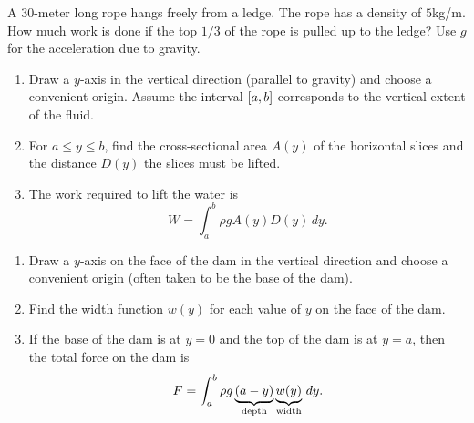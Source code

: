 \documentclass[../mathNotesPreamble]{subfiles}
\begin{document}
  \begin{ex*}
    A $30$-meter long rope hangs freely from a ledge. The rope has a density of $5$\nobreakspace kg/m.  How much work is done if the top $1/3$ of the rope is pulled up to the ledge? Use $g$ for the acceleration due to gravity.
  \end{ex*}
  \pagebreak

  \begin{thmBox*}
    \begin{enumerate}
      \item 
        Draw a $y$-axis in the vertical direction (parallel to gravity) and choose a convenient origin. Assume the interval ${\left[a,b\right]}$ corresponds to the vertical extent of the fluid.
      \item 
        For $a\leq y\leq b$, find the cross-sectional area $A(y)$ of the horizontal slices and the distance $D(y)$ the slices must be lifted.
      \item 
        The work required to lift the water is
          \[W=\int_a^b \rho gA(y)D(y)\,dy.\]
    \end{enumerate}
  \end{thmBox*}

  \begin{ex*}
    
  \end{ex*}
  \pagebreak

  \begin{thmBox*}
    \begin{enumerate}
      \item 
        Draw a $y$-axis on the face of the dam in the vertical direction and choose a convenient origin (often taken to be the base of the dam).
      \item 
        Find the width function $w(y)$ for each value of $y$ on the face of the dam.
      \item 
        If the base of the dam is at $y=0$ and the top of the dam is at $y=a$, then the total force on the dam is
          \[F=\int_a^b \rho g\underbrace{(a-y)}_{\textnormal{depth}}\underbrace{w(y)}_{\textnormal{width}}\,dy.\]
    \end{enumerate}
  \end{thmBox*}
\end{document}
